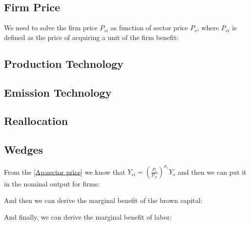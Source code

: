 \documentclass[12pt]{article} %
\begin{document}
\subsection{Firm Price} \label{Ap:firm_price}
We need to solve the firm price $P_{si}$ as function of sector price $P_s$, where $P_{si}$ is defined as the price of acquiring a unit of the firm benefit:
    

\subsection{Production Technology}
\label{Ap:Productiontechnology}

\subsection{Emission Technology}
\label{Ap:Emissiontechnology}



\subsection{Reallocation} \label{Ap:reallocation}




\subsection{Wedges} \label{Ap:wedges}
From the \ref{Ap:sector price} we know that $Y_{si} = (\frac{P_s}{ P_{si}})^{\sigma_s}{Y}_s $ and then we can put it in the nominal output for firms:

And then we can derive the marginal benefit of the brown capital:

And finally, we can derive the marginal benefit of labor:

\subsection*{}


\end{document}
